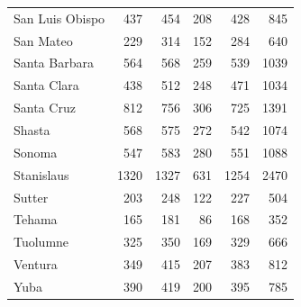 \documentclass{asaproc}
\begin{document}
\begin{table}[p!]
\begin{tabular}{lrrrrr}
  San Luis Obispo & 437 & 454 & 208 & 428 & 845 \\ 
  San Mateo & 229 & 314 & 152 & 284 & 640 \\ 
  Santa Barbara & 564 & 568 & 259 & 539 & 1039 \\ 
  Santa Clara & 438 & 512 & 248 & 471 & 1034 \\ 
  Santa Cruz & 812 & 756 & 306 & 725 & 1391 \\ 
  Shasta & 568 & 575 & 272 & 542 & 1074 \\ 
  Sonoma & 547 & 583 & 280 & 551 & 1088 \\ 
  Stanislaus & 1320 & 1327 & 631 & 1254 & 2470 \\ 
  Sutter & 203 & 248 & 122 & 227 & 504 \\ 
  Tehama & 165 & 181 & 86 & 168 & 352 \\ 
  Tuolumne & 325 & 350 & 169 & 329 & 666 \\ 
  Ventura & 349 & 415 & 207 & 383 & 812 \\ 
  Yuba & 390 & 419 & 200 & 395 & 785 \\ 
   \hline
\end{tabular}
\end{table}
\end{document}
